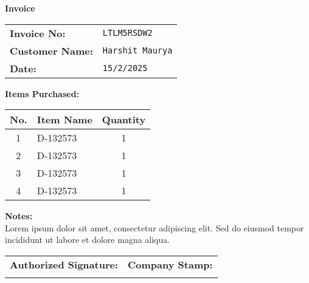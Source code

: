 \documentclass{article}
\begin{document}
        \begin{center}
            {\Huge \textbf{Invoice}} \\[1em]
        \end{center}

        \noindent
        \begin{tabular}{@{}ll@{}}
            \textbf{Invoice No:} & \texttt{LTLM5RSDW2} \\
            \textbf{Customer Name:} & \texttt{Harshit Maurya} \\
            \textbf{Date:} & \texttt{15/2/2025} \\
        \end{tabular}

        \vspace{2em}

        \textbf{Items Purchased:} \\

        \begin{tabular}{|c|l|c|}
            \hline
            \textbf{No.} & \textbf{Item Name} & \textbf{Quantity} \\
            \hline
            1 & D-132573 & 1 \\ \hline
2 & D-132573 & 1 \\ \hline
3 & D-132573 & 1 \\ \hline
4 & D-132573 & 1 \\ \hline
        \end{tabular}

        \vspace{2em}

        \noindent
        \textbf{Notes:} \\
        Lorem ipsum dolor sit amet, consectetur adipiscing elit. Sed do eiusmod tempor incididunt ut labore et dolore magna aliqua.
        \vspace{1em}

        \noindent
        \begin{tabular}{@{}p{}p{}@{}}
            \textbf{Authorized Signature:} & \textbf{Company Stamp:} \\
            \vspace{2cm} & \vspace{2cm} \\
        \end{tabular}

        
\end{document}
